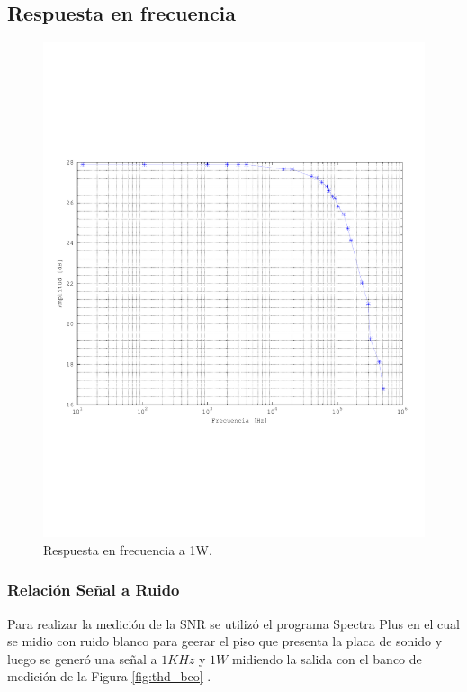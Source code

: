 		\subsection{Respuesta en frecuencia}

		\begin{figure}[H]
			\centering
			\includegraphics[scale=0.5]{./Figuras/bw_total.pdf}
			\caption{Respuesta en frecuencia a 1W.}
		\end{figure}

		\subsubsection{Relación Señal a Ruido}
		Para realizar la medición de la SNR se utilizó el programa Spectra Plus en el cual se midio con ruido blanco para geerar el piso que presenta la placa de sonido y luego se generó una señal a $1KHz$ y $1W$ midiendo la salida con el banco de medición de la Figura \ref{fig:thd_bco} .



